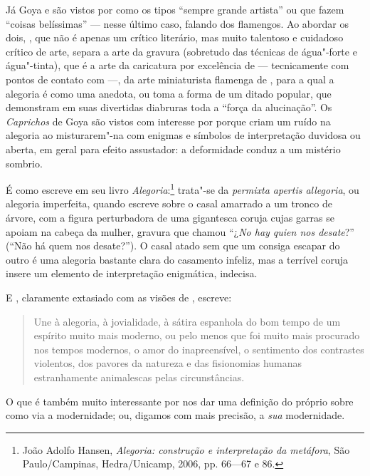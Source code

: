 Já Goya e  são vistos por  como os tipos “sempre
grande artista” ou que fazem “coisas belíssimas” --- nesse último caso,
falando dos flamengos. Ao abordar os dois, , que não é apenas
um crítico literário, mas muito talentoso e cuidadoso crítico de arte,
separa a arte da gravura (sobretudo das técnicas de água"-forte e
água"-tinta), que é a arte da caricatura por excelência de  ---
tecnicamente com pontos de contato com  ---, da arte
miniaturista flamenga de , para a qual a alegoria é como uma anedota,
ou toma a forma de um ditado popular, que demonstram em suas divertidas
diabruras toda a “força da alucinação”. Os \textit{Caprichos} de Goya
são vistos com interesse por  porque criam um ruído na
alegoria ao misturarem"-na com enigmas e símbolos de interpretação
duvidosa ou aberta, em geral para efeito assustador: a deformidade
conduz a um mistério sombrio.

É como  escreve em seu livro
\textit{Alegoria}:\footnote{ João Adolfo Hansen, \textit{Alegoria:
construção e interpretação da metáfora}, São Paulo/Campinas,
Hedra/Unicamp, 2006, pp. 66---67 e 86.} trata"-se da
\textit{permixta apertis allegoria}, ou alegoria imperfeita, quando
escreve sobre o casal amarrado a um tronco de árvore, com a figura
perturbadora de uma gigantesca coruja cujas garras se apoiam na cabeça
da mulher, gravura que  chamou “¿\textit{No hay quien nos desate}?”
(``Não há quem nos desate?''). O casal atado sem que um consiga
escapar do outro é uma alegoria bastante clara do casamento infeliz,
mas a terrível coruja insere um elemento de interpretação enigmática,
indecisa.

E , claramente extasiado com as visões de , escreve: 

\begin{quote}
Une à alegoria, à jovialidade, à sátira espanhola do bom tempo de
 um espírito muito mais moderno, ou pelo menos que foi muito
mais procurado nos tempos modernos, o amor do inapreensível, o
sentimento dos contrastes violentos, dos pavores da natureza e das
fisionomias humanas estranhamente animalescas pelas circunstâncias.
\end{quote}

O que é também muito interessante por nos dar uma definição do próprio
 sobre como via a modernidade; ou, digamos com mais precisão,
a \textit{sua} modernidade.

